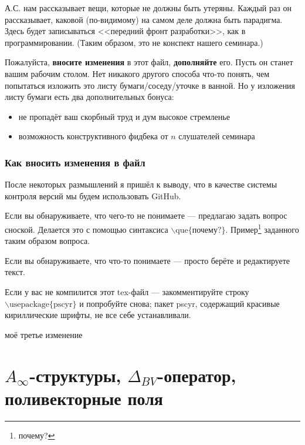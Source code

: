 \documentclass[11pt]{article}
\theoremstyle{remark}
\theoremstyle{definition}
\newcommand{\que}[1]{\footnote{\textcolor[rgb]{0.38,0.69,0.82}{#1}}}
\begin{document}
\baselineskip14pt
\bigskip


\tableofcontents
\bigskip
\bigskip


А.С. нам рассказывает вещи, которые не должны быть утеряны. Каждый раз он рассказывает, каковой (по-видимому) на самом деле должна быть парадигма. Здесь будет записываться <<передний фронт разработки>>, как в программировании. (Таким образом, это не конспект нашего семинара.)

Пожалуйста, \textbf{вносите изменения} в этот файл, \textbf{дополняйте} его. Пусть он станет вашим рабочим столом. Нет никакого другого способа что-то понять, чем попытаться изложить это листу бумаги/соседу/уточке в ванной. Но у изложения листу бумаги есть два дополнительных бонуса:
\begin{itemize}
  \item не пропадёт ваш скорбный труд и дум высокое стремленье
  \item возможность конструктивного фидбека от $n$ слушателей семинара
\end{itemize}

\subsubsection{Как вносить изменения в файл}

После некоторых размышлений я пришёл к выводу, что в качестве системы контроля версий мы будем использовать GitHub.

Если вы обнаруживаете, что чего-то не понимаете --- предлагаю задать вопрос сноской. Делается это с помощью синтаксиса $\backslash \text{que} \{ \text{почему?} \}$. Пример\que{почему?} заданного таким образом вопроса.

Если вы обнаруживаете, что что-то понимаете --- просто берёте и редактируете текст.

Если у вас не компилится этот tex-файл --- закомментируйте строку $\backslash\text{usepackage}\{ \text{pscyr} \}$ и попробуйте снова; пакет pscyr, содержащий красивые кириллические шрифты, не все себе устанавливали.

моё третье изменение

\newpage




\section{$A_{\infty}$-структуры, $\Delta_{BV}$-оператор, поливекторные поля}
\end{document}
